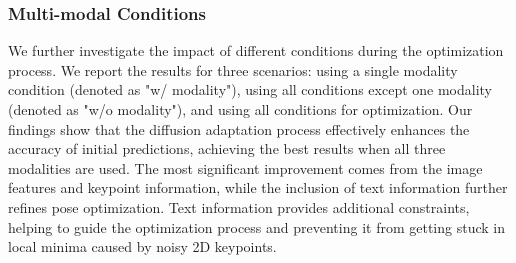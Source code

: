{\subsubsection{Multi-modal Conditions}
We further investigate the impact of different conditions during the optimization process. We report the results for three scenarios: using a single modality condition (denoted as "w/ modality"), using all conditions except one modality (denoted as "w/o modality"), and using all conditions for optimization. Our findings show that the diffusion adaptation process effectively enhances the accuracy of initial predictions, achieving the best results when all three modalities are used. The most significant improvement comes from the image features and keypoint information, while the inclusion of text information further refines pose optimization. Text information provides additional constraints, helping to guide the optimization process and preventing it from getting stuck in local minima caused by noisy 2D keypoints.

\vspace{-1mm}

}